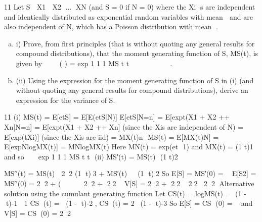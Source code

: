 \documentclass[a4paper,12pt]{article}
\begin{document}
 11 Let S  X1  X2 ... XN (and S = 0 if N = 0) where the Xi s are independent and identically distributed as exponential random variables with mean  and are also independent of N, which has a Poisson distribution with mean .
\begin{enumerate}[(a)]
    \item i) Prove, from first principles (that is without quoting any general results for compound distributions), that the moment generating function of S, MS(t), is
given by    ( ) = exp 1 1 1 MS t t        	
. 
\item (ii) Using the expression for the moment generating function of S in (i) (and without quoting any general results for compound distributions), derive an expression for the variance of S. 
\end{enumerate}

\newpage
11 (i) MS(t) = E[etS] = E[E(etS|N)]
E[etS|N=n] = E[exp{t(X1 + X2 ++ Xn}|N=n]
= E[exp{t(X1 + X2 ++ Xn}] (since the Xis are independent of N)
= 
 E[exp(tXi)] (since the Xis are iid)
= {MX(t)}n
 MS(t) = E[{MX(t)}N] = E[exp{NlogMX(t)}] = MN{logMX(t)}
Here MN(t) = exp{(et  1)} and MX(t) = (1 	t)1 and so
     exp 1 1 1 MS t t       	 
(ii) MS′(t) = MS(t)  (1 	 t)2

MS′′(t) = MS(t)  22 (1 	 t)3 + MS′(t)  (1 	 t)2
So E[S] = MS′(0) = 
E[S2] = MS′′(0) = 22 + (  
22 + 22
V[S] = 22 + 22	22
22
Alternative solution using the cumulant generating function
Let CS(t) = logMS(t) = {(1 - t)-1  1}
CS (t) = (1 - t)-2 , CS(t) = 2(1 - t)-3
So E[S] = CS (0) =  and V[S] = CS(0) = 22
\end{document}
